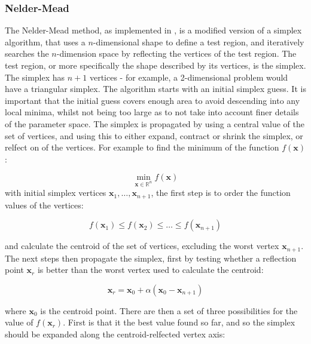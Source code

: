 \subsubsection{Nelder-Mead}
\label{nelder_mead}
The Nelder-Mead method, as implemented in , is a modified version of a simplex
algorithm, that uses a $n$-dimensional shape to define a test region, and iteratively
searches the $n$-dimension space by reflecting the vertices of the test region. 
The test region, or more specifically the shape described by its vertices, is the
simplex. The simplex has $n+1$ vertices - for example, a 2-dimensional problem
would have a triangular simplex.
The algorithm starts with an initial simplex guess. It is important that the initial
guess covers enough area to avoid descending into any local minima, whilst not being
too large as to not take into account finer details of the parameter space.
The simplex is propagated by using a central value of the set of vertices, and using
this to either expand, contract or shrink the simplex, or relfect on of the vertices.
For example to find the minimum of the function $f\left(\mathbf{x}\right)$:

\begin{equation}
\min_{\mathbf{x} \in \mathbb{R}^n} f\left( \mathbf{x} \right)
\end{equation}
with initial simplex vertices $\mathbf{x}_1, \dots, \mathbf{x}_{n+1}$,
the first step is to order the function values of the vertices:

\begin{equation}
f\left(\mathbf{x}_1\right) \leq f\left(\mathbf{x}_2\right) \leq \dots \leq f\left(\mathbf{x}_{n+1}\right)
\end{equation}

and calculate the centroid of the set of vertices, excluding the worst vertex 
$\mathbf{x}_{n+1}$. The next steps then propagate the simplex, first by testing 
whether a reflection point $\mathbf{x}_r$ is better than the worst vertex used to
calculate the centroid:

\begin{equation}
\mathbf{x}_r = \mathbf{x}_0 + \alpha\left(\mathbf{x}_0 - \mathbf{x}_{n+1}\right) 
\end{equation}

where $\mathbf{x}_0$ is the centroid point. There are then a set of three possibilities
for the value of $f\left(\mathbf{x}_r\right)$. First is that it the best value
found so far, and so the simplex should be expanded along the centroid-relfected 
vertex axis:


